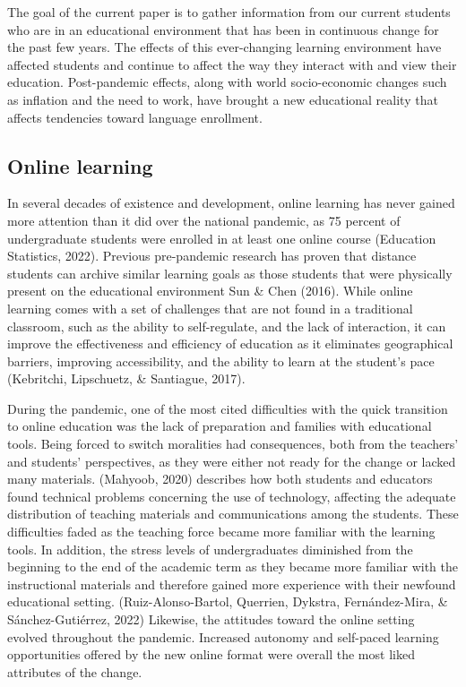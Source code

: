 \documentclass[
  man]{apa6}
\begin{document}
The goal of the current paper is to gather information from our current students who are in an educational environment that has been in continuous change for the past few years.
The effects of this ever-changing learning environment have affected students and continue to affect the way they interact with and view their education.
Post-pandemic effects, along with world socio-economic changes such as inflation and the need to work, have brought a new educational reality that affects tendencies toward language enrollment.

\hypertarget{online-learning}{%
\subsection{Online learning}\label{online-learning}}

In several decades of existence and development, online learning has never gained more attention than it did over the national pandemic, as 75 percent of undergraduate students were enrolled in at least one online course (Education Statistics, 2022).
Previous pre-pandemic research has proven that distance students can archive similar learning goals as those students that were physically present on the educational environment Sun \& Chen (2016).
While online learning comes with a set of challenges that are not found in a traditional classroom, such as the ability to self-regulate, and the lack of interaction, it can improve the effectiveness and efficiency of education as it eliminates geographical barriers, improving accessibility, and the ability to learn at the student's pace (Kebritchi, Lipschuetz, \& Santiague, 2017).

During the pandemic, one of the most cited difficulties with the quick transition to online education was the lack of preparation and families with educational tools.
Being forced to switch moralities had consequences, both from the teachers' and students' perspectives, as they were either not ready for the change or lacked many materials.
(Mahyoob, 2020) describes how both students and educators found technical problems concerning the use of technology, affecting the adequate distribution of teaching materials and communications among the students.
These difficulties faded as the teaching force became more familiar with the learning tools.
In addition, the stress levels of undergraduates diminished from the beginning to the end of the academic term as they became more familiar with the instructional materials and therefore gained more experience with their newfound educational setting.
(Ruiz-Alonso-Bartol, Querrien, Dykstra, Fernández-Mira, \& Sánchez-Gutiérrez, 2022)
Likewise, the attitudes toward the online setting evolved throughout the pandemic. Increased autonomy and self-paced learning opportunities offered by the new online format were overall the most liked attributes of the change.
\end{document}

